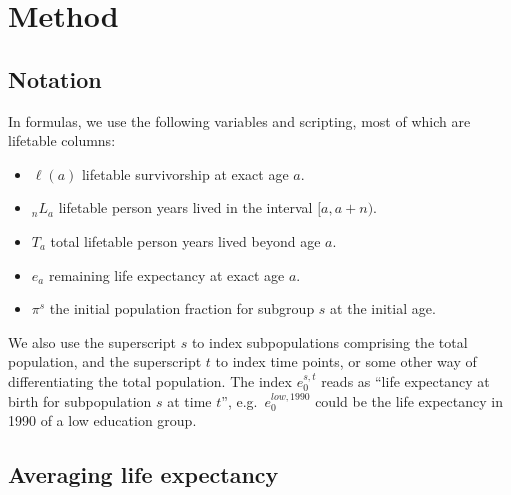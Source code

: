 \documentclass[sn-apa,pdflatex]{sn-jnl}
\theoremstyle{remark}
\theoremstyle{definition}
\begin{document}
\hypertarget{method}{%
\section{Method}\label{method}}

\hypertarget{notation}{%
\subsection{Notation}\label{notation}}

In formulas, we use the following variables and scripting, most of which
are lifetable columns:

\begin{itemize}

\item{$\ell(a)$} lifetable survivorship at exact age $a$.

\item{${}_nL_a$} lifetable person years lived in the interval $[a,a+n)$.

\item{$T_a$} total lifetable person years lived beyond age $a$.

\item{$e_a$} remaining life expectancy at exact age $a$.

\item{$\pi^s$} the initial population fraction for subgroup $s$ at the initial age. 
\end{itemize}

We also use the superscript \(s\) to index subpopulations comprising the
total population, and the superscript \(t\) to index time points, or
some other way of differentiating the total population. The index
\(e^{s,t}_0\) reads as ``life expectancy at birth for subpopulation
\(s\) at time \(t\)'', e.g.~\(e^{low, 1990}_0\) could be the life
expectancy in 1990 of a low education group.

\hypertarget{averaging-life-expectancy}{%
\subsection{Averaging life expectancy}\label{averaging-life-expectancy}}
\end{document}
